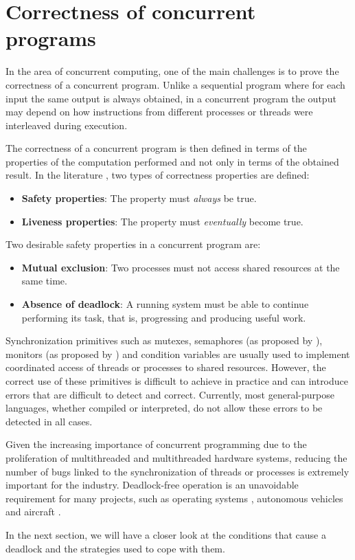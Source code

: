 \documentclass[../Thesis.tex]{subfiles}
\begin{document}
\section{Correctness of concurrent programs}

In the area of concurrent computing, one of the main challenges is
to prove the correctness of a concurrent program.
Unlike a sequential program where for each input the same output
is always obtained, in a concurrent program the output may depend
on how instructions from different processes or threads were interleaved during execution.

The correctness of a concurrent program is then defined
in terms of the properties of the computation performed
and not only in terms of the obtained result.
In the literature \cite{ben-ari2006,coulouris2012,tanenbaum2017},
two types of correctness properties are defined:

\begin{itemize}
  \item \textbf{Safety properties}: The property must \emph{always} be true.
  \item \textbf{Liveness properties}: The property must \emph{eventually} become true.

\end{itemize}

Two desirable safety properties in a concurrent program are:

\begin{itemize}
  \item \textbf{Mutual exclusion}: Two processes must not access shared resources at the same time.
  \item \textbf{Absence of deadlock}: A running system must be able to continue performing its task,
        that is, progressing and producing useful work.
\end{itemize}

Synchronization primitives such as mutexes, semaphores (as proposed by \cite{Dijkstra2002}),
monitors (as proposed by \cite{hoare1974monitors}) and condition variables are usually used
to implement coordinated access of threads or processes to shared resources.
However, the correct use of these primitives is difficult to achieve in practice
and can introduce errors that are difficult to detect and correct.
Currently, most general-purpose languages, whether compiled or interpreted,
do not allow these errors to be detected in all cases.

Given the increasing importance of concurrent programming due to the proliferation
of multithreaded and multithreaded hardware systems,
reducing the number of bugs linked to the synchronization of threads or processes
is extremely important for the industry.
Deadlock-free operation is an unavoidable requirement for many projects, such as
operating systems \cite{ArpaciDusseau2018}, autonomous vehicles \cite{Perronnet2019}
and aircraft \cite{carreno2005safety,monzon2009deadlock}.

In the next section, we will have a closer look at the conditions that cause a deadlock
and the strategies used to cope with them.
\end{document}
